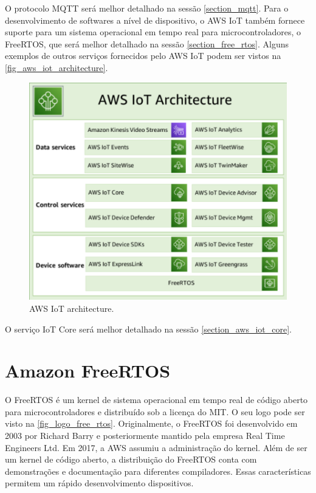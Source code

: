 O protocolo MQTT será melhor detalhado na sessão \autoref{section_mqtt}. Para o desenvolvimento de softwares a nível de dispositivo, o AWS IoT também fornece suporte para um sistema operacional em tempo real para microcontroladores, o FreeRTOS, que será melhor detalhado na sessão \autoref{section_free_rtos}. Alguns exemplos de outros serviços fornecidos pelo AWS IoT podem ser vistos na \autoref{fig_aws_iot_architecture}.

\begin{figure}[htb]\label{fig_aws_iot_architecture}
	\caption{AWS IoT architecture.}
	\begin{center}
		\includegraphics[scale=0.7]{Imagens/aws_iot_architecture.pdf}
	\end{center}
\end{figure}

O serviço IoT Core será melhor detalhado na sessão \autoref{section_aws_iot_core}.

\section{Amazon FreeRTOS}\label{section_free_rtos}
O FreeRTOS é um kernel de sistema operacional em tempo real de código aberto para microcontroladores e distribuído sob a licença do MIT. O seu logo pode ser visto na \autoref{fig_logo_free_rtos}. Originalmente, o FreeRTOS foi desenvolvido em 2003 por Richard Barry e posteriormente mantido pela empresa Real Time Engineers Ltd. Em 2017, a AWS assumiu a administração do kernel. Além de ser um kernel de código aberto, a distribuição do FreeRTOS conta com demonstrações e documentação para diferentes compiladores. Essas características permitem um rápido desenvolvimento dispositivos.

